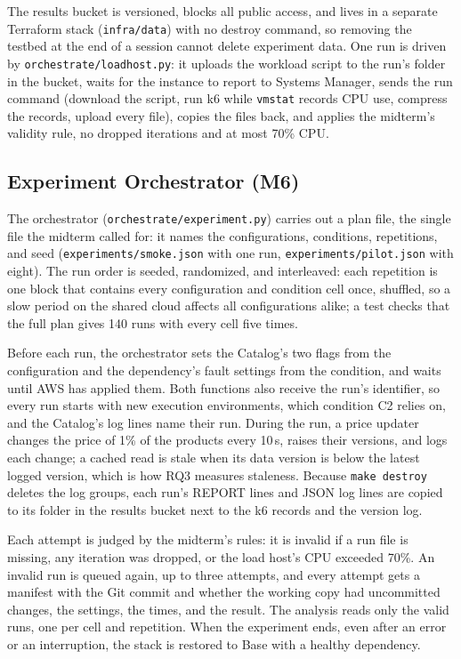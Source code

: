 \documentclass[10pt]{article}
\begin{document}
The results bucket is versioned, blocks all public access, and lives in a
separate Terraform stack (\texttt{infra/data}) with no destroy command, so
removing the testbed at the end of a session cannot delete experiment data.
One run is driven by \texttt{orchestrate/loadhost.py}: it uploads the
workload script to the run's folder in the bucket, waits for the instance to
report to Systems Manager, sends the run command (download the script, run k6
while \texttt{vmstat} records CPU use, compress the records, upload every
file), copies the files back, and applies the midterm's validity rule, no
dropped iterations and at most 70\% CPU.

\subsection{Experiment Orchestrator (M6)}
The orchestrator (\texttt{orchestrate/experiment.py}) carries out a plan file,
the single file the midterm called for: it names the configurations,
conditions, repetitions, and seed (\texttt{experiments/smoke.json} with one
run, \texttt{experiments/pilot.json} with eight). The run order is seeded,
randomized, and interleaved: each repetition is one block that contains every
configuration and condition cell once, shuffled, so a slow period on the
shared cloud affects all configurations alike; a test checks that the full
plan gives 140 runs with every cell five times.

Before each run, the orchestrator sets the Catalog's two flags from the
configuration and the dependency's fault settings from the condition, and
waits until AWS has applied them. Both functions also receive the run's
identifier, so every run starts with new execution environments, which
condition C2 relies on, and the Catalog's log lines name their run. During the
run, a price updater changes the price of 1\% of the products every 10\,s,
raises their versions, and logs each change; a cached read is stale when its
data version is below the latest logged version, which is how RQ3 measures
staleness. Because \texttt{make destroy} deletes the log groups, each run's
REPORT lines and JSON log lines are copied to its folder in the results
bucket next to the k6 records and the version log.

Each attempt is judged by the midterm's rules: it is invalid if a run file is
missing, any iteration was dropped, or the load host's CPU exceeded 70\%. An
invalid run is queued again, up to three attempts, and every attempt gets a
manifest with the Git commit and whether the working copy had uncommitted
changes, the settings, the times, and the result. The analysis reads only the
valid runs, one per cell and repetition. When the experiment ends, even after
an error or an interruption, the stack is restored to Base with a healthy
dependency.
\end{document}
